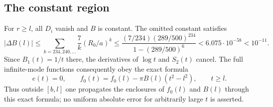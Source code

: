 \subsection{The constant region}
\label{tail:constant-region}

For $r\geq l$, all $D_i$ vanish and $B$ is constant.  The omitted
constant satisfies
\[
 |\Delta B(l)|\leq
 \sum_{k=234,240,\ldots}\frac7k(R_0/a)^k
 \leq\frac{(7/234)(289/500)^{234}}{1-(289/500)^6}
 <6.075\cdot10^{-58}<10^{-11}.
\]
Since $B_1(t)=1/t$ there, the derivatives of $\log t$ and $S_2(t)$
cancel.  The full infinite-mode functions consequently obey the
exact formula
\begin{equation}
 e(t)=0,\qquad
 f_0(t)=f_0(l)-\pi B(l)(t^2-l^2),\qquad t\geq l.
 \label{tail:exterior-formula}
\end{equation}
Thus outside $[b,l]$ one propagates the enclosures of $f_0(l)$ and
$B(l)$ through this exact formula; no uniform absolute error for
arbitrarily large $t$ is asserted.
